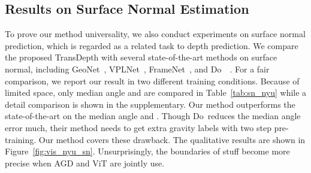 \documentclass[10pt,twocolumn,letterpaper]{article}
\begin{document}
\begin{table}[t] \small
\caption{Surface Normal Estimation: NYU dataset.}
\label{tab:sn_nyu}
\centering
{}
\vspace{-0.4cm}
\end{table}

\subsection{Results on Surface Normal Estimation}
To prove our method universality, we also conduct experiments on surface normal prediction, which is regarded as a related task to depth prediction.
We compare the proposed TransDepth with several state-of-the-art methods on surface normal, including GeoNet~\cite{qi2018geonet}, VPLNet~\cite{wang2020vplnet}, FrameNet~\cite{huang2019framenet}, and Do~\etal~\cite{do2020surface}.
For a fair comparison, we report our result in two different training conditions. Because of limited space, only median angle and  are compared in Table~\ref{tab:sn_nyu} while a detail comparison is shown in the supplementary. Our method outperforms the state-of-the-art on the median angle and . Though Do~\etal reduces the median angle error much, their method needs to get extra gravity labels with two step pre-training. Our method covers these drawback. The qualitative results are shown in Figure~\ref{fig:vis_nyu_sn}. Unsurprisingly, the boundaries of stuff become more precise when AGD and ViT are jointly use.
\end{document}
